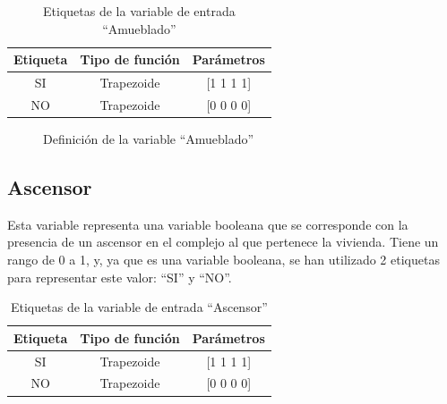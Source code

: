 \documentclass[12pt]{report} %
\begin{document}
        \begin{table}[h]
            \center
            \begin{tabular}{@{}ccc@{}}
                \toprule
                \textbf{Etiqueta} & \textbf{Tipo de función} & \textbf{Parámetros} \\
                \midrule
                SI & Trapezoide & [1 1 1 1] \\
                NO & Trapezoide & [0 0 0 0] \\
                \bottomrule
            \end{tabular}
            \caption{Etiquetas de la variable de entrada ``Amueblado''}
        \end{table}

        \begin{figure}[H]
            \centering
            \caption{Definición de la variable ``Amueblado''}
        \end{figure}

        \subsection{Ascensor}
        Esta variable representa una variable booleana que se corresponde con la presencia de un ascensor en el complejo al que pertenece la vivienda. 
        Tiene un rango de 0 a 1, y, ya que es una variable booleana, se han utilizado 2 etiquetas para representar este valor: ``SI'' y ``NO''.

        \begin{table}[h]
            \center
            \begin{tabular}{@{}ccc@{}}
                \toprule
                \textbf{Etiqueta} & \textbf{Tipo de función} & \textbf{Parámetros} \\
                \midrule
                SI & Trapezoide & [1 1 1 1] \\
                NO & Trapezoide & [0 0 0 0] \\
                \bottomrule
            \end{tabular}
            \caption{Etiquetas de la variable de entrada ``Ascensor''}
        \end{table}
\end{document}
